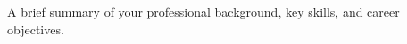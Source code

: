 

\begin{cvparagraph}

A brief summary of your professional background, key skills, and career objectives.

\end{cvparagraph}
